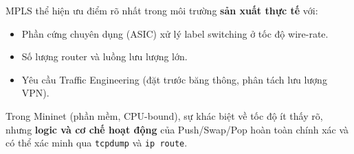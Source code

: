 MPLS thể hiện ưu điểm rõ nhất trong môi trường \textbf{sản xuất thực tế} với:
\begin{itemize}
    \item Phần cứng chuyên dụng (ASIC) xử lý label switching ở tốc độ wire-rate.
    \item Số lượng router và luồng lưu lượng lớn.
    \item Yêu cầu Traffic Engineering (đặt trước băng thông, phân tách lưu lượng VPN).
\end{itemize}

Trong Mininet (phần mềm, CPU-bound), sự khác biệt về tốc độ ít thấy rõ, nhưng \textbf{logic và cơ chế hoạt động} của Push/Swap/Pop hoàn toàn chính xác và có thể xác minh qua \texttt{tcpdump} và \texttt{ip route}.
